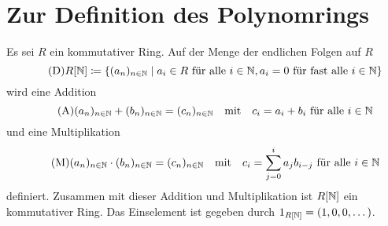 \section{Zur Definition des Polynomrings}

Es sei $R$ ein kommutativer Ring.
Auf der Menge der endlichen Folgen auf $R$
\begin{equation}
  \tag{D}
  \label{equation: definition}
  R[\mathbb{N}]
  \coloneqq
  \{
    (a_n)_{n \in \mathbb{N}}
  \mid
    \text{$a_i \in R$ für alle $i \in \mathbb{N}$},
    \text{$a_i = 0$ für fast alle $i \in \mathbb{N}$} 
  \}
\end{equation}
wird eine Addition
\begin{equation}
  \tag{A}
  \label{equation: addition}
    (a_n)_{n \in \mathbb{N}} + (b_n)_{n \in \mathbb{N}}
  = (c_n)_{n \in \mathbb{N}}
  \quad\text{mit}\quad
  \text{$c_i = a_i + b_i$ für alle $i \in \mathbb{N}$}
\end{equation}
und eine Multiplikation
\begin{equation}
  \tag{M}
  \label{equation: multiplication}
    (a_n)_{n \in \mathbb{N}} \cdot (b_n)_{n \in \mathbb{N}}
  = (c_n)_{n \in \mathbb{N}}
  \quad\text{mit}\quad
  \text{$c_i = \sum_{j=0}^i a_j b_{i-j}$ für alle $i \in \mathbb{N}$}
\end{equation}
definiert.
Zusammen mit dieser Addition und Multiplikation ist $R[\mathbb{N}]$ ein kommutativer Ring.
Das Einselement ist gegeben durch $1_{R[\mathbb{N}]} = (1, 0, 0, \dotsc)$.

